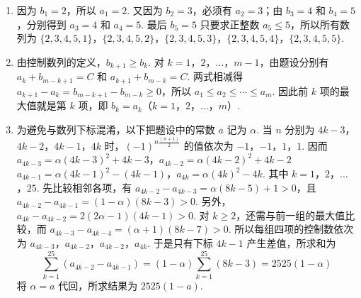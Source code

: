\begin{solution}
\begin{enumerate}
\item 因为 \(b_1=2\)，所以 \(a_1=2\). 又因为 \(b_2=3\)，必须有 \(a_2=3\)；由 \(b_3=4\) 和 \(b_4=5\)，分别得到 \(a_3=4\) 和 \(a_4=5\). 最后 \(b_5=5\) 只要求正整数 \(a_5\leqslant5\)，所以所有数列为 \(\{2,3,4,5,1\}\)，\(\{2,3,4,5,2\}\)，\(\{2,3,4,5,3\}\)，\(\{2,3,4,5,4\}\)，\(\{2,3,4,5,5\}\).
\item 由控制数列的定义，\(b_{k+1}\geqslant b_k\). 对 \(k=1\)，\(2\)，\(\ldots\)，\(m-1\)，由题设分别有 \(a_k+b_{m-k+1}=C\) 和 \(a_{k+1}+b_{m-k}=C\). 两式相减得 \(a_{k+1}-a_k=b_{m-k+1}-b_{m-k}\geqslant0\)，所以 \(a_1\leqslant a_2\leqslant\cdots\leqslant a_m\). 因此前 \(k\) 项的最大值就是第 \(k\) 项，即 \(b_k=a_k\)（\(k=1\)，\(2\)，\(\ldots\)，\(m\)）.
\item 为避免与数列下标混淆，以下把题设中的常数 \(a\) 记为 \(\alpha\). 当 \(n\) 分别为 \(4k-3\)，\(4k-2\)，\(4k-1\)，\(4k\) 时，\((-1)^{n\frac{(n+1)}{2}}\) 的值依次为 \(-1\)，\(-1\)，\(1\)，\(1\). 因而
\(a_{4k-3}=\alpha(4k-3)^2+4k-3\)，\(a_{4k-2}=\alpha(4k-2)^2+4k-2\)
\(a_{4k-1}=\alpha(4k-1)^2-(4k-1)\)，\(a_{4k}=\alpha(4k)^2-4k\).
其中 \(k=1\)，\(2\)，\(\ldots\)，\(25\). 先比较相邻各项，有 \(a_{4k-2}-a_{4k-3}=\alpha(8k-5)+1>0\)，且 \(a_{4k-2}-a_{4k-1}=(1-\alpha)(8k-3)>0\). 另外，\(a_{4k}-a_{4k-2}=2(2\alpha-1)(4k-1)>0\). 对 \(k\geqslant2\)，还需与前一组的最大值比较，而 \(a_{4k-3}-a_{4k-4}=(\alpha+1)(8k-7)>0\). 所以每组四项的控制数依次为 \(a_{4k-3}\)，\(a_{4k-2}\)，\(a_{4k-2}\)，\(a_{4k}\). 于是只有下标 \(4k-1\) 产生差值，所求和为
\[
\sum_{k=1}^{25}(a_{4k-2}-a_{4k-1})=(1-\alpha)\sum_{k=1}^{25}(8k-3)=2525(1-\alpha)
\]
将 \(\alpha=a\) 代回，所求结果为 \(2525(1-a)\).
\end{enumerate}
\end{solution}
